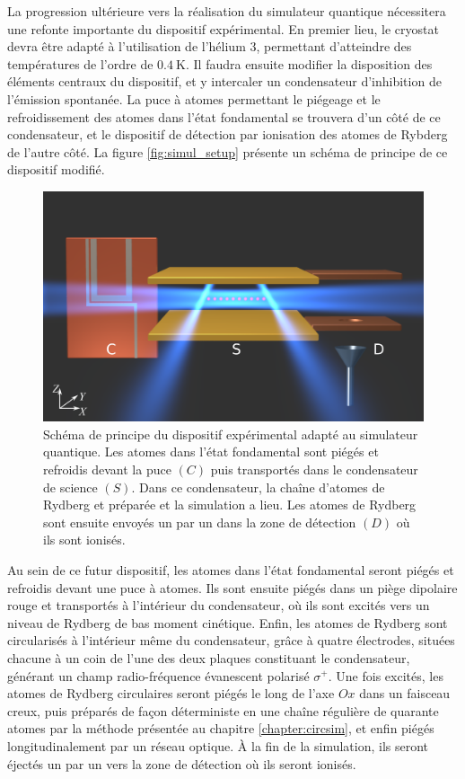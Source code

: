 \bigskip
La progression ultérieure vers la réalisation du simulateur quantique nécessitera une refonte importante du dispositif expérimental.
En premier lieu, le cryostat devra être adapté à l'utilisation de l'hélium $3$, permettant d'atteindre des températures de l'ordre de $\SI{0.4}{\K}$.
Il faudra ensuite modifier la disposition des éléments centraux du dispositif, et y intercaler un condensateur d'inhibition de l'émission spontanée.
La puce à atomes permettant le piégeage et le refroidissement des atomes dans l'état fondamental se trouvera d'un côté de ce condensateur, et le dispositif de détection par ionisation des atomes de Rybderg de l'autre côté.
La figure \eqref{fig:simul_setup} présente un schéma de principe de ce dispositif modifié.
%
\begin{figure}[t]
\centering
\includegraphics[width=0.6\linewidth]{figures/compscheme}
\caption[Schéma de principe du dispositif expérimental adapté au simulateur quantique]{
Schéma de principe du dispositif expérimental adapté au simulateur quantique.
Les atomes dans l'état fondamental sont piégés et refroidis devant la puce $(C)$ puis transportés dans le condensateur de science $(S)$.
Dans ce condensateur, la chaîne d'atomes de Rydberg et préparée et la simulation a lieu.
Les atomes de Rydberg sont ensuite envoyés un par un dans la zone de détection $(D)$ où ils sont ionisés.
}
\label{fig:simul_setup}
\end{figure}
%

Au sein de ce futur dispositif, les atomes dans l'état fondamental seront piégés et refroidis devant une puce à atomes.
Ils sont ensuite piégés dans un piège dipolaire rouge et transportés à l'intérieur du condensateur, où ils sont excités vers un niveau de Rydberg de bas moment cinétique.
Enfin, les atomes de Rydberg sont \og circularisés \fg{} à l'intérieur même du condensateur, grâce à quatre électrodes, situées chacune à un coin de l'une des deux plaques constituant le condensateur, générant un champ radio-fréquence évanescent polarisé $\sigma^+$.
Une fois excités, les atomes de Rydberg circulaires seront piégés le long de l'axe $Ox$ dans un faisceau creux, puis préparés de façon déterministe en une chaîne régulière de quarante atomes par la méthode présentée au chapitre \ref{chapter:circsim}, et enfin piégés longitudinalement par un réseau optique.
\`A la fin de la simulation, ils seront éjectés un par un vers la zone de détection où ils seront ionisés.

